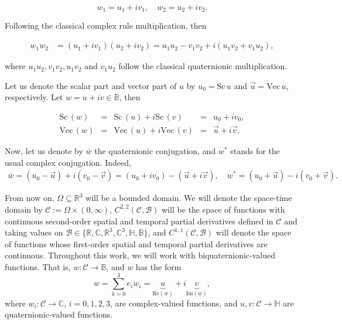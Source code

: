 \documentclass[12pt]{article}
\def\H{\mathbb{H}}
\def\C{\mathbb{C}}
\def\R{\mathbb{R}}
\def\Sc{\mbox{Sc}\,}
\def\Vec{\mbox{Vec}\,}
\def\H{\mathbb{H}}
\def\B{\mathbb{B}}
\def\C{\mathbb{C}}
\def\R{\mathbb{R}}
\def\Sc{\mbox{Sc}\,}
\def\Vec{\mbox{Vec}\,}
\newcommand{\conj}[1]{\overline{#1}}
\newcommand{\Real}[1]{\text{Re}\left( #1 \right)}
\newcommand{\Imag}[1]{\text{Im}\left( #1 \right)}
\begin{document}
\begin{equation*}
    w_1=u_1+iv_1, \quad w_2=u_2+iv_2.
\end{equation*}

Following the classical complex rule multiplication, then 

\begin{align*}
    w_1w_2&=(u_1+iv_1)(u_2+iv_2)=u_1u_2-v_1v_2+i(u_1v_2+v_1u_2),
\end{align*}

where $u_1u_2,v_1v_2,u_1v_2$ and $v_1u_2$ follow the classical quaternionic multiplication.

Let us denote the scalar part and vector part of $u$ by $u_0=\Sc{u}$ and $\vec u=\Vec{u}$, respectively. Let $w=u+iv\in\B$, then 

\begin{equation*}
    \begin{array}{rcccl}
        \Sc(w)&=&\Sc(u)+i\Sc(v)&=& u_0+iv_0,\\
        \Vec(w)&=&\Vec(u)+i\Vec(v)&=&\vec{u}+i\vec{v}.
    \end{array}
\end{equation*}

Now, let us denote by $\conj{w}$ the quaternionic conjugation, and $w^*$ stands for the usual complex conjugation. Indeed,
\begin{equation*}
    \begin{array}{rcl}
        \conj{w}=(u_{0}-\vec{u})+i(v_{0}-\vec{v})=(u_0+iv_0)-(\vec u+i\vec v), \quad w^*=(u_{0}+\vec{u})-i(v_{0}+\vec{v}).
    \end{array}
\end{equation*}

From now on, $\Omega\subseteq \R^3$ will be a bounded domain. We will denote the space-time domain by $\mathscr{C}:=\Omega\times (0,\infty)$, $C^{2,2}(\mathscr{C},\mathcal{B})$ will be the space of functions with continuous second-order spatial and temporal partial derivatives defined in $\mathscr{C}$ and taking values on $\mathcal{B}\in \{\mathbb{R}, \mathbb{C},\mathbb{R}^3, \mathbb{C}^3,\H, \mathbb{B}\} $, and $C^{1,1}(\mathscr{C},\mathcal{B})$ will denote the space of functions whose first-order spatial and temporal partial derivatives are continuous. Throughout this work, we will work with biquaternionic-valued functions. That is, $w:\mathscr{C}\to\B$, and $w$ has the form
\begin{equation}\label{eq:real+imaginary}
    w=\sum_{k=0}^3 e_iw_i= \underbrace{u}_{\Real{w}}+i\underbrace{v}_{\Imag{w}},
\end{equation}
where $w_i:\mathscr{C}\to\C$, $i=0,1,2,3$, are complex-valued functions, and $u, v: \mathscr{C}\to\H$ are quaternionic-valued functions.
\end{document}

